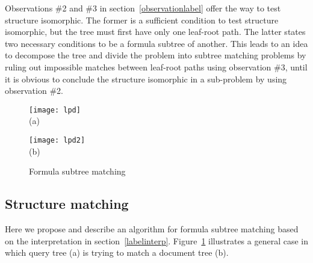Observations \#2 and \#3 in section~\ref{observationlabel} offer the way to test structure isomorphic.
The former is a sufficient condition to test structure isomorphic, but the tree must first have only one leaf-root path. The latter states two necessary conditions to be a formula subtree of another.
This leads to an idea to decompose the tree and divide the problem into subtree matching problems by ruling out impossible matches between leaf-root paths using observation \#3, until it is obvious to conclude the structure isomorphic in a sub-problem by using observation \#2.

\begin{figure}
\begin{minipage}[b]{2.65in}
\begin{center}
\texttt{[image: lpd]}
\\ (a)
\end{center}
\end{minipage}
\hspace*{.38in}
\begin{minipage}[b]{2.65in}
\begin{center}
{\texttt{[image: lpd2]}}
\\ (b) 
\end{center}
\end{minipage}
\caption{Formula subtree matching}\label{submatch}
\end{figure}

\subsection{Structure matching}
Here we propose and describe an algorithm for formula subtree matching based on the interpretation in section~\ref{labelinterp}.
Figure~\ref{submatch} illustrates a general case in which query tree (a) is trying to match a document tree (b).

